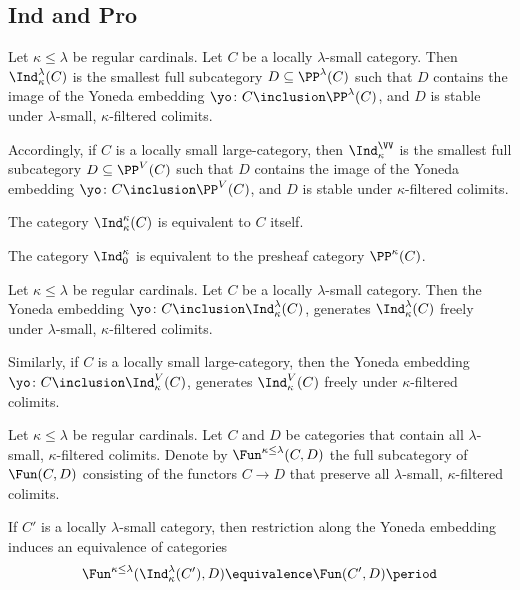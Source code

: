 \subsection{Ind and Pro}%
\label{sub:ind_and_pro}

\begin{definition}
	Let $ \kappa \leq \lambda $ be regular cardinals.
	Let $ C $ be a locally $ \lambda $-small category.
	Then $ \Ind_{\kappa}^{\lambda}(C) $ is
	the smallest full subcategory $ D \subseteq \PP^{\lambda}(C) $
	such that $ D $ contains the image
	of the Yoneda embedding
	$ \yo \colon C \inclusion \PP^{\lambda}(C) $,
	and $ D $ is stable under
	$ \lambda $-small, $ \kappa $-filtered colimits.

	Accordingly, if $ C $ is a locally small large-category,
	then $ \Ind_{\kappa}^{\VV} $ is
	the smallest full subcategory $ D \subseteq \PP^V(C) $
	such that $ D $ contains the image
	of the Yoneda embedding
	$ \yo \colon C \inclusion \PP^V(C) $,
	and $ D $ is stable under $ \kappa $-filtered colimits.
\end{definition}

\begin{eg}
	The category $ \Ind_{\kappa}^{\kappa}(C) $ is
	equivalent to $ C $ itself.
\end{eg}

\begin{eg}
	The category $ \Ind_0^{\kappa} $ is 
	equivalent to the presheaf category $ \PP^{\kappa}(C) $.
\end{eg}

\begin{proposition}
	Let $ \kappa \leq \lambda $ be regular cardinals.
	Let $ C $ be a locally $ \lambda $-small category.
	Then the Yoneda embedding
	$ \yo \colon C \inclusion \Ind_{\kappa}^{\lambda}(C) $,
	generates $ \Ind_{\kappa}^{\lambda}(C) $ freely under
	$ \lambda $-small, $ \kappa $-filtered colimits.

	Similarly, if $ C $ is a locally small large-category,
	then the Yoneda embedding
	$ \yo \colon C \inclusion \Ind_{\kappa}^{V}(C) $,
	generates $ \Ind_{\kappa}^V(C) $ freely under
	$ \kappa $-filtered colimits.
\end{proposition}

\begin{notation}
	Let $ \kappa \leq \lambda $ be regular cardinals.
	Let $ C $ and $ D $  be categories
	that contain all $ \lambda $-small, $ \kappa $-filtered colimits.
	Denote by $ \Fun^{\kappa \leq \lambda}(C, D) $
	the full subcategory of $ \Fun(C,D) $ consisting of
	the functors $ C \to D $ that preserve all 
	$ \lambda $-small, $ \kappa $-filtered colimits.

	If $ C' $ is a locally $ \lambda $-small category,
	then restriction along the Yoneda embedding
	induces an equivalence of categories
	\[
		\Fun^{\kappa \leq \lambda}(\Ind_{\kappa}^{\lambda}(C'), D)
		\equivalence \Fun(C', D) \period
	\]
\end{notation}

